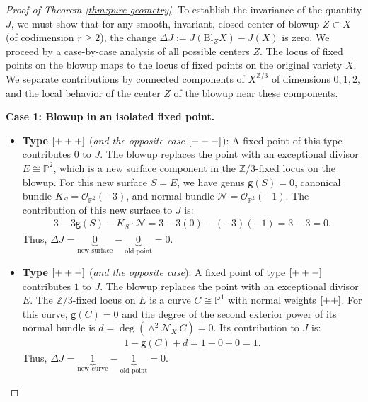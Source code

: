 \documentclass[10pt,a4paper]{amsart}
\newcommand{\Z}{\mathbb{Z}}
\newcommand{\lm}{\textup{\texttt{-}}}
\newcommand{\lp}{\textup{\texttt{+}}}
\begin{document}
\begin{proof}[Proof of Theorem \ref{thm:pure-geometry}]
To establish the invariance of the quantity $J$, we must show that for any smooth, invariant, closed center of blowup $Z \subset X$ (of codimension $r \geq 2$), the change $\Delta J:= J(\mathrm{Bl}_Z X) - J(X)$ is zero. We proceed by a case-by-case analysis of all possible centers $Z$. The locus of fixed points on the blowup maps to the locus of fixed points on the original variety $X$. We separate contributions by connected components of $X^{\Z/3}$ of dimensions $0,1,2$, and the local behavior of the center $Z$ of the blowup near these components. 

\noindent \textbf{Case 1: Blowup in an isolated fixed point.}

\begin{itemize}
    \item \textbf{Type $[\lp\lp\lp]$} (\textit{and the opposite case  $[\lm\lm\lm]$}): A fixed point of this type contributes $0$ to $J$. The blowup replaces the point with an exceptional divisor $E \cong \mathbb{P}^2$, which is a new surface component in the $\mathbb Z/3$-fixed locus on the blowup. For this new surface $S=E$, we have genus $\mathsf{g}(S)=0$, canonical bundle $K_S = \mathcal{O}_{\mathbb{P}^2}(-3)$, and normal bundle $\mathcal{N}=\mathcal{O}_{\mathbb{P}^2}(-1)$. The contribution of this new surface to $J$ is:
    \begin{align}
        3 - 3\mathsf{g}(S) - K_S \cdot \mathcal{N} = 3 - 3(0) - (-3)(-1) = 3 - 3 = 0.
    \end{align}
    Thus, $\Delta J = \underbrace{0}_{\text{new surface}} - \underbrace{0}_{\text{old point}} = 0$.

    \item \textbf{Type $[\lp\lp\lm]$} (\textit{and the opposite case}): A fixed point of type $[\lp\lp\lm]$ contributes $1$ to $J$. The blowup replaces the point with an exceptional divisor $E$. The $\mathbb Z/3$-fixed locus on $E$ is a curve $C \cong \mathbb{P}^1$ with normal weights $[\lp\lp]$. For this curve, $\mathsf{g}(C) = 0$ and the degree of the second exterior power of its normal bundle is $d = \deg(\wedge^2 \mathcal{N}_{X'}C) = 0$. Its contribution to $J$ is:
    \begin{align}
        1 - \mathsf{g}(C) + d = 1 - 0 + 0 = 1.
    \end{align}
    Thus, $\Delta J = \underbrace{1}_{\text{new curve}} - \underbrace{1}_{\text{old point}} = 0$.
\end{itemize}


\end{proof}
\end{document}
